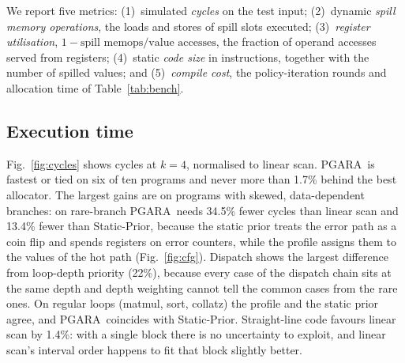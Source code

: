 \documentclass[conference]{IEEEtran}
\newcommand{\MG}{PGARA}
\begin{document}
We report five metrics: (1)~simulated \emph{cycles} on the test input;
(2)~dynamic \emph{spill memory operations}, the loads and stores of
spill slots executed; (3)~\emph{register utilisation},
$1-\text{spill memops}/\text{value accesses}$, the fraction of operand
accesses served from registers; (4)~static \emph{code size} in
instructions, together with the number of spilled values; and
(5)~\emph{compile cost}, the policy-iteration rounds and allocation
time of Table~\ref{tab:bench}.

\subsection{Execution time}

Fig.~\ref{fig:cycles} shows cycles at $k=4$, normalised to linear scan.
\MG\ is fastest or tied on six of ten programs and never more than
1.7\% behind the best allocator. The largest gains are on programs with
skewed, data-dependent branches: on rare-branch \MG\ needs 34.5\% fewer
cycles than linear scan and 13.4\% fewer than Static-Prior, because the
static prior treats the error path as a coin flip and spends registers
on error counters, while the profile assigns them to the values of the
hot path (Fig.~\ref{fig:cfg}). Dispatch shows the largest difference
from loop-depth priority (22\%), because every case of the dispatch
chain sits at the same depth and depth weighting cannot tell the common
cases from the rare ones. On regular loops (matmul, sort, collatz) the
profile and the static prior agree, and \MG\ coincides with
Static-Prior. Straight-line code favours linear scan by 1.4\%: with a
single block there is no uncertainty to exploit, and linear scan's
interval order happens to fit that block slightly better.
\end{document}
